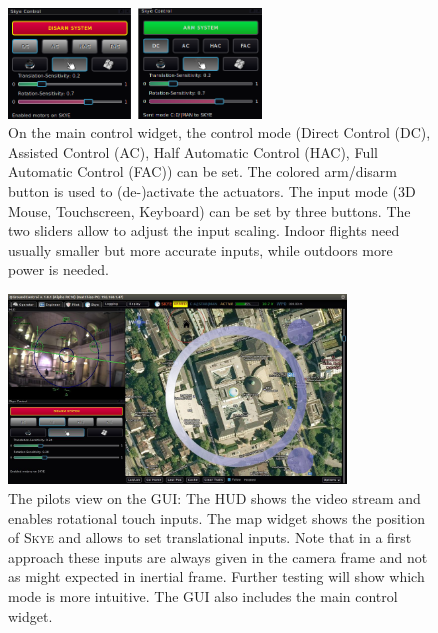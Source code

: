 \begin{figure}[H] %
	\begin{center}
		\includegraphics[width=0.6\textwidth]{qgc_skye_control}
		\caption[Main control widget]{On the main control widget, the control mode (Direct Control (DC), Assisted Control (AC), Half Automatic Control (HAC), Full Automatic Control (FAC)) can be set. The colored arm/disarm button is used to (de-)activate the actuators. The input mode (3D Mouse, Touchscreen, Keyboard) can be set by three buttons. The two sliders allow to adjust the input scaling. Indoor flights need usually smaller but more accurate inputs, while outdoors more power is needed.}  
		\label{figure:qgc_skye_control}		
	\end{center}
\end{figure}

\begin{figure}[H] %
	\begin{center}
		\includegraphics[width=0.8\textwidth]{qgc_manual_control}
		\caption[Manual control view of Graphical User Interface]{The pilots view on the GUI\footnotemark : The HUD shows the video stream and enables rotational touch inputs. The map widget shows the position of \textsc{Skye} and allows to set translational inputs. Note that in a first approach these inputs are always given in the camera frame and not as might expected in inertial frame. Further testing will show which mode is more intuitive. The GUI also includes the main control widget.}  
		\label{figure:qgc_manual_control}		
	\end{center}
\end{figure}

